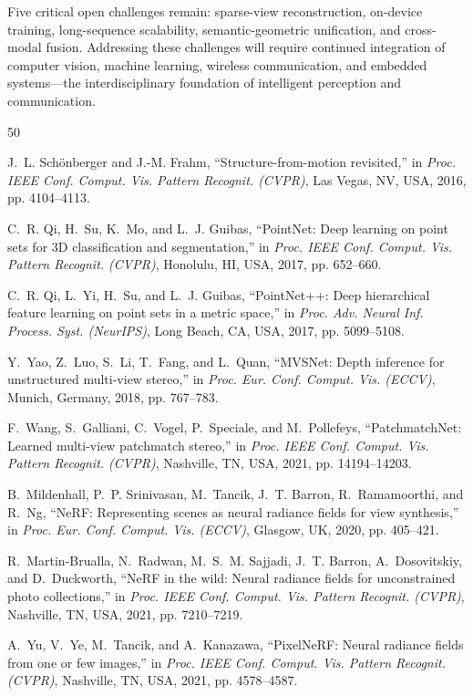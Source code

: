 \documentclass[journal]{IEEEtran}
\begin{document}
Five critical open challenges remain: sparse-view reconstruction, on-device training, long-sequence scalability, semantic-geometric unification, and cross-modal fusion. Addressing these challenges will require continued integration of computer vision, machine learning, wireless communication, and embedded systems---the interdisciplinary foundation of intelligent perception and communication.

\begin{thebibliography}{50}

 J.~L. Sch\"onberger and J.-M. Frahm, ``Structure-from-motion revisited,'' in \textit{Proc. IEEE Conf. Comput. Vis. Pattern Recognit. (CVPR)}, Las Vegas, NV, USA, 2016, pp. 4104--4113.

 C.~R. Qi, H.~Su, K.~Mo, and L.~J. Guibas, ``PointNet: Deep learning on point sets for 3D classification and segmentation,'' in \textit{Proc. IEEE Conf. Comput. Vis. Pattern Recognit. (CVPR)}, Honolulu, HI, USA, 2017, pp. 652--660.

 C.~R. Qi, L.~Yi, H.~Su, and L.~J. Guibas, ``PointNet++: Deep hierarchical feature learning on point sets in a metric space,'' in \textit{Proc. Adv. Neural Inf. Process. Syst. (NeurIPS)}, Long Beach, CA, USA, 2017, pp. 5099--5108.

 Y.~Yao, Z.~Luo, S.~Li, T.~Fang, and L.~Quan, ``MVSNet: Depth inference for unstructured multi-view stereo,'' in \textit{Proc. Eur. Conf. Comput. Vis. (ECCV)}, Munich, Germany, 2018, pp. 767--783.

 F.~Wang, S.~Galliani, C.~Vogel, P.~Speciale, and M.~Pollefeys, ``PatchmatchNet: Learned multi-view patchmatch stereo,'' in \textit{Proc. IEEE Conf. Comput. Vis. Pattern Recognit. (CVPR)}, Nashville, TN, USA, 2021, pp. 14194--14203.

 B.~Mildenhall, P.~P. Srinivasan, M.~Tancik, J.~T. Barron, R.~Ramamoorthi, and R.~Ng, ``NeRF: Representing scenes as neural radiance fields for view synthesis,'' in \textit{Proc. Eur. Conf. Comput. Vis. (ECCV)}, Glasgow, UK, 2020, pp. 405--421.

 R.~Martin-Brualla, N.~Radwan, M.~S.~M. Sajjadi, J.~T. Barron, A.~Dosovitskiy, and D.~Duckworth, ``NeRF in the wild: Neural radiance fields for unconstrained photo collections,'' in \textit{Proc. IEEE Conf. Comput. Vis. Pattern Recognit. (CVPR)}, Nashville, TN, USA, 2021, pp. 7210--7219.

 A.~Yu, V.~Ye, M.~Tancik, and A.~Kanazawa, ``PixelNeRF: Neural radiance fields from one or few images,'' in \textit{Proc. IEEE Conf. Comput. Vis. Pattern Recognit. (CVPR)}, Nashville, TN, USA, 2021, pp. 4578--4587.


\end{thebibliography}
\end{document}
